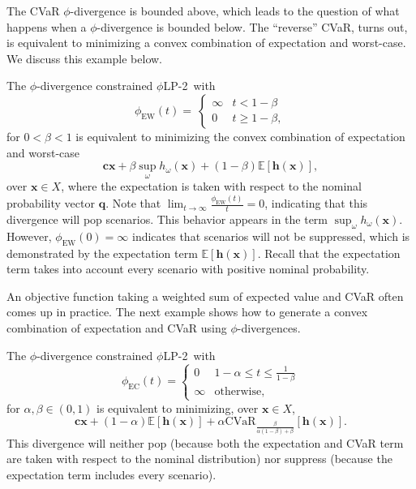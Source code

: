 \documentclass[opre,nonblindrev]{informs3} %
\newcommand{\E}{\mathbb{E}}
\newcommand{\e}[1]{\E \left[ #1 \right]}
\newcommand{\x}{\mathbf{x}}
\renewcommand{\c}{\mathbf{c}}
\renewcommand{\h}{\mathbf{h}}
\newcommand{\q}{\mathbf{q}}
\newcommand{\plp}{$\phi$LP-2}
\begin{document}
The CVaR $\phi$-divergence is bounded above, which leads to the question of what happens when a $\phi$-divergence is bounded below.
The ``reverse'' CVaR, turns out, is equivalent to minimizing a convex combination of expectation and worst-case. 
We discuss this example below. 


\begin{example}
	\label{ex:rcvar}
	The $\phi$-divergence constrained \plp\ with
	\[
		\phi_{\text{EW}}(t) = \
		\begin{cases}
			\infty & t < 1-\beta \\
			0 & t \geq 1-\beta,
		\end{cases}
	\]
	for $0 < \beta < 1$ is equivalent to minimizing the convex combination of expectation and worst-case
	\[
		\c\x + \beta \sup_\omega h_\omega(\x) + (1-\beta)\e{\h(\x)},
	\]
	over $\x \in X$, where the expectation is taken with respect to the nominal probability vector $\q$.
	Note that $\lim_{t \rightarrow \infty} \frac{\phi_{\text{EW}}(t)}{t} = 0$, indicating that this divergence will pop scenarios.
	This behavior appears in the term $\sup_\omega h_\omega(\x)$.
	However, $\phi_{\text{EW}}(0) = \infty$ indicates that scenarios will not be suppressed, which is demonstrated by the expectation term $\e{\h(\x)}$. 
	Recall that the expectation term takes into account every scenario with positive nominal probability.
	\Halmos
\end{example}



An objective function taking a weighted sum of expected value and CVaR often comes up in practice.
The next example shows how to generate a convex combination of expectation and CVaR using $\phi$-divergences.

\begin{example}
	\label{ex:cvar_expectation}
	The $\phi$-divergence constrained \plp\ with
	\[
		\phi_{\text{EC}}(t) = 
		\begin{cases}
			0 & 1-\alpha \leq t \leq \frac{1}{1-\beta} \\
			\infty & \text{otherwise},
		\end{cases}
	\]
	for $\alpha,\beta \in (0,1)$ is equivalent to minimizing, over $\x \in X$,
	\[
		\c\x + (1-\alpha)\e{\h(\x)} + \alpha \mbox{CVaR}_{\frac{\beta}{\alpha(1-\beta)+\beta}}[\h(\x)].
	\]
	This divergence will neither pop (because both the expectation and CVaR term are taken with respect to the nominal distribution) nor suppress (because the expectation term includes every scenario).
	\Halmos
\end{example}
\end{document}
